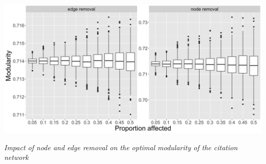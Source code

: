 {\begin{center}
\includegraphics[width=\textwidth]{figures/Fig9.jpg}
\end{center}

\medskip

\textit{Impact of node and edge removal on the optimal modularity of the citation network}


}




